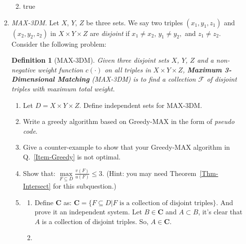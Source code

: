 \documentclass[12pt,a4paper]{article}
\makeatletter
\newtheorem*{solution}{Solution}
\newtheorem{definition}{Definition}
\theoremstyle{definition}
\renewenvironment{solution}[1][Solution] {\par\pushQED{\qed}\normalfont\topsep6\p@\@plus6\p@\relax\trivlist\item[\hskip\labelsep\bfseries#1\@addpunct{.}]\ignorespaces}{\popQED\endtrivlist\@endpefalse} \makeatother
\makeatother
\begin{document}
\begin{enumerate}
\begin{enumerate}
\begin{solution}
\begin{algorithm}[H]
					
					\Return true\;
	
				\end{algorithm}
            \end{solution}
    \end{enumerate}

\item \textit{MAX-3DM.} Let $X$, $Y$, $Z$ be three sets. We say two triples $\left(x_{1}, y_{1}, z_{1}\right)$ and $\left(x_{2}, y_{2}, z_{2}\right)$ in $X \times Y \times Z$ are \textit{disjoint} if $x_{1} \neq x_{2}$, $y_{1} \neq y_{2},$ and $z_{1} \neq z_{2}$. Consider the following problem:
    
    \begin{definition}[MAX-3DM] 
        Given three disjoint sets $X$, $Y$, $Z$ and a non-negative weight function $c(\cdot)$ on all triples in $X \times Y \times Z$, \textbf{Maximum 3-Dimensional Matching} (MAX-3DM) is to find a collection $\mathcal{F}$ of disjoint triples with maximum total weight.
    \end{definition}

    \begin{enumerate}
    	\item Let $D = X \times Y \times Z$. Define independent sets for MAX-3DM.
    	\item Write a greedy algorithm based on Greedy-MAX in the form of \emph{pseudo code}. \label{Item-Greedy}
    	\item Give a counter-example to show that your Greedy-MAX algorithm in Q.~\ref{Item-Greedy} is not optimal.
    	\item Show that: $\max\limits_{F \subseteq D} \frac{v(F)}{u(F)} \leq 3$. {\color{blue}(Hint: you may need Theorem~\ref{Thm-Intersect} for this subquestion.)} 
    	    \begin{solution}
    	        \begin{enumerate}
					\item Define $\mathbf{C}$ as: $\mathbf{C}=\{F\subseteq D|F \text{ is a collection of disjoint triples}\}$. And prove it an independent system. Let $B\in \mathbf{C}$ and $A\subset B$, it's clear that $A$ is a collection of disjoint triples. So, $A\in \mathbf{C}$.
					\item \begin{algorithm}[H]
						
						\BlankLine
						\caption{MAX-3DM}\label{Alg-greedy}
			

\end{algorithm}
\end{enumerate}
\end{solution}
\end{enumerate}
\end{enumerate}
\end{document}
